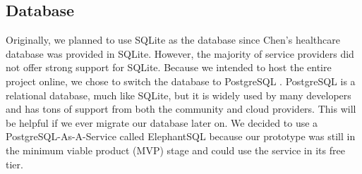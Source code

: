 




\subsection{Database}
Originally, we planned to use SQLite \cite{sqlite} as the database since Chen's healthcare database was provided in SQLite. However, the majority of service providers did not offer strong support for SQLite. Because we intended to host the entire project online, we chose to switch the database to PostgreSQL \cite{postgresql}. PostgreSQL is a relational database, much like SQLite, but it is widely used by many developers and has tons of support from both the community and cloud providers. This will be helpful if we ever migrate our database later on.
We decided to use a PostgreSQL-As-A-Service called ElephantSQL \cite{elephantsql} because our prototype was still in the minimum viable product (MVP) stage and could use the service in its free tier.


